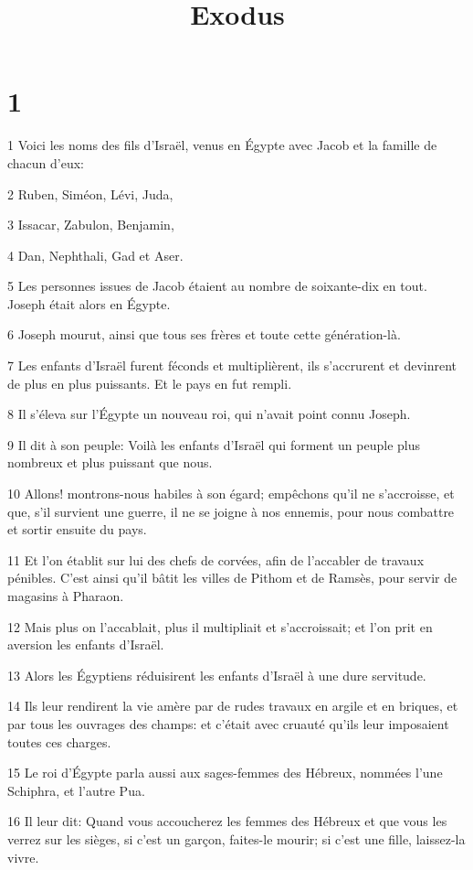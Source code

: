 

\title{Exodus}


\chapter{1}

\par 1 Voici les noms des fils d'Israël, venus en Égypte avec Jacob et la famille de chacun d'eux:
\par 2 Ruben, Siméon, Lévi, Juda,
\par 3 Issacar, Zabulon, Benjamin,
\par 4 Dan, Nephthali, Gad et Aser.
\par 5 Les personnes issues de Jacob étaient au nombre de soixante-dix en tout. Joseph était alors en Égypte.
\par 6 Joseph mourut, ainsi que tous ses frères et toute cette génération-là.
\par 7 Les enfants d'Israël furent féconds et multiplièrent, ils s'accrurent et devinrent de plus en plus puissants. Et le pays en fut rempli.
\par 8 Il s'éleva sur l'Égypte un nouveau roi, qui n'avait point connu Joseph.
\par 9 Il dit à son peuple: Voilà les enfants d'Israël qui forment un peuple plus nombreux et plus puissant que nous.
\par 10 Allons! montrons-nous habiles à son égard; empêchons qu'il ne s'accroisse, et que, s'il survient une guerre, il ne se joigne à nos ennemis, pour nous combattre et sortir ensuite du pays.
\par 11 Et l'on établit sur lui des chefs de corvées, afin de l'accabler de travaux pénibles. C'est ainsi qu'il bâtit les villes de Pithom et de Ramsès, pour servir de magasins à Pharaon.
\par 12 Mais plus on l'accablait, plus il multipliait et s'accroissait; et l'on prit en aversion les enfants d'Israël.
\par 13 Alors les Égyptiens réduisirent les enfants d'Israël à une dure servitude.
\par 14 Ils leur rendirent la vie amère par de rudes travaux en argile et en briques, et par tous les ouvrages des champs: et c'était avec cruauté qu'ils leur imposaient toutes ces charges.
\par 15 Le roi d'Égypte parla aussi aux sages-femmes des Hébreux, nommées l'une Schiphra, et l'autre Pua.
\par 16 Il leur dit: Quand vous accoucherez les femmes des Hébreux et que vous les verrez sur les sièges, si c'est un garçon, faites-le mourir; si c'est une fille, laissez-la vivre.
